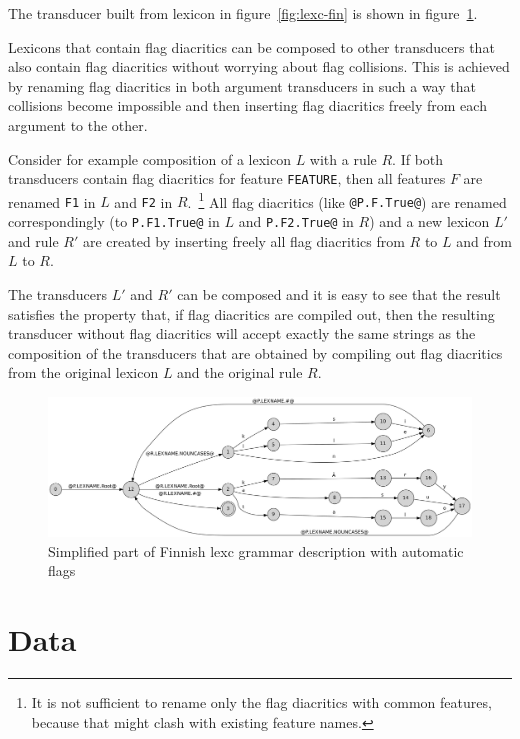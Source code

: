 \documentclass[11pt]{article}
\begin{document}
The transducer built from lexicon in figure~\ref{fig:lexc-fin} is shown in figure~\ref{fig:lexc-fin-flag}. 


Lexicons that contain flag diacritics can be composed to other
transducers that also contain flag diacritics without worrying about
flag collisions. This is achieved by renaming flag diacritics in both
argument transducers in such a way that collisions become impossible
and then inserting flag diacritics freely from each argument to the
other.

Consider for example composition of a lexicon $L$ with a rule $R$. If
both transducers contain flag diacritics for feature {\tt FEATURE},
then all features $F$ are renamed {\tt F1} in $L$ and {\tt F2} in
$R$.~\footnote{It is not sufficient to rename only the flag diacritics
  with common features, because that might clash with existing feature
  names.} All flag diacritics (like {\tt @P.F.True@}) are renamed
correspondingly (to {\tt P.F1.True@} in $L$ and {\tt P.F2.True@} in
$R$) and a new lexicon $L'$ and rule $R'$ are created by inserting
freely all flag diacritics from $R$ to $L$ and from $L$ to $R$.

The transducers $L'$ and $R'$ can be composed and it is easy to
see that the result satisfies the property that, if flag diacritics
are compiled out, then the resulting transducer without flag
diacritics will accept exactly the same strings as the composition of
the transducers that are obtained by compiling out flag diacritics
from the original lexicon $L$ and the original rule $R$.


\begin{figure}
    \includegraphics[width=\textwidth]{transducer.png}
     \caption{Simplified part of Finnish lexc grammar description with automatic flags
     \label{fig:lexc-fin-flag}}
\end{figure}

\section{Data}
\label{sec:data}
\end{document}
